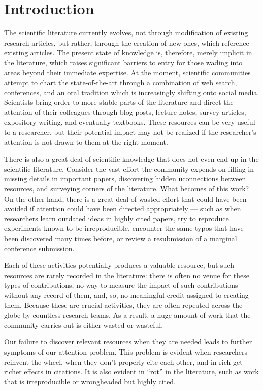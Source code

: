 \documentclass{article} %
\begin{document}
\section{Introduction}
The scientific literature currently evolves,
not through modification of existing research articles, 
but rather, through the creation of new ones, which reference existing articles.
The present state of knowledge is, therefore, merely implicit in the literature,
which raises significant barriers to entry for those wading into areas beyond their immediate expertise.
At the moment, scientific communities attempt to chart the state-of-the-art
through
a combination of web search, conferences, and an oral tradition which is increasingly shifting onto social media. 
%
Scientists bring order to more stable parts of the literature and direct the attention of their colleagues through 
blog posts, lecture notes, survey articles, expository writing, and eventually textbooks.
These resources can be very useful to a researcher,
but their potential impact may not be realized
if the researcher's attention is not drawn to them at the right moment.

There is also a great deal of scientific knowledge that does not even end up in the scientific literature.
Consider the vast effort the community expends on 
filling in missing details in important papers, 
discovering hidden uconnections between resources, 
and surveying corners of the literature.
What becomes of this work?
%
On the other hand, there is a great deal of wasted effort that could have been avoided if attention could have been directed appropriately --- such as when
researchers learn outdated ideas in highly cited papers,
try to reproduce experiments known to be irreproducible, 
encounter the same typos that have been discovered many times before,
or review a resubmission of a marginal conference submission.


Each of these activities potentially produces a valuable resource, but 
such resources are rarely recorded in the literature: there is often no venue for these types of contributions,
no way to measure the impact of such contributions without any record of them,
and, so, no meaningful credit assigned to creating them.
Because these are crucial activities, they are often repeated across the globe by countless research teams.
As a result, a huge amount of work that the community carries out is either wasted or wasteful.


Our failure to discover relevant resources when they are needed leads to 
further symptoms of our attention problem.
This problem is evident when researchers reinvent the wheel, when they don't properly cite each other, and in rich-get-richer effects in citations. It is also evident in ``rot'' in the literature, such as work that is irreproducible or wrongheaded but highly cited.
\end{document}
